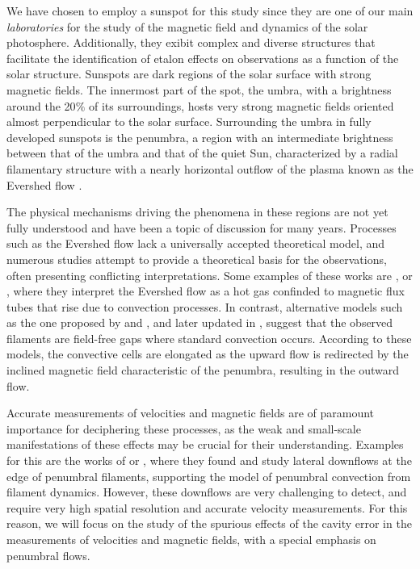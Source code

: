 We have chosen to employ a sunspot for this study since they are one of our main \textit{laboratories} for the study of the magnetic field and dynamics of the solar photosphere. Additionally, they exibit complex and diverse structures that facilitate the identification of etalon effects on observations as a function of the solar structure. Sunspots are dark regions of the solar surface with strong magnetic fields. The innermost part of the spot, the umbra, with a brightness around the 20$\%$ of its surroundings, hosts very strong magnetic fields oriented almost perpendicular to the solar surface. Surrounding the umbra in fully developed sunspots is the penumbra, a region with an intermediate brightness between that of the umbra and that of the quiet Sun, characterized by a radial filamentary structure with a nearly horizontal outflow of the plasma known as the Evershed flow \citep{evershed}. 

The physical mechanisms driving the phenomena in these regions are not yet fully understood and have been a topic of discussion for many years. Processes such as the Evershed flow lack a universally accepted theoretical model, and numerous studies attempt to provide a theoretical basis for the observations, often presenting conflicting interpretations. Some examples of these works are \cite{evershed_magnetic_flux}, or \cite{evershed_magnetic_2}, where they interpret the Evershed flow as a hot gas confinded to magnetic flux tubes that rise due to convection processes. In contrast, alternative models such as the one proposed by \cite{evershed_model_scharmer} and \cite{evershed_model_spruit}, and later updated in \cite{evershed_magnetic_scharmer}, suggest that the observed filaments are field-free gaps where standard convection occurs. According to these models, the convective cells are elongated as the upward flow is redirected by the inclined magnetic field characteristic of the penumbra, resulting in the outward flow.  

Accurate measurements of velocities and magnetic fields are of paramount importance for deciphering these processes, as the weak and small-scale manifestations of these effects may be crucial for their understanding. Examples for this are the works of \cite{lateral_downflows_2} or \cite{lateral_downflows}, where they found and study lateral downflows at the edge of penumbral filaments, supporting the model of penumbral convection from filament dynamics. However, these downflows are very challenging to detect, and require very high spatial resolution and accurate velocity measurements. For this reason, we will focus on the study of the spurious effects of the cavity error in the measurements of velocities and magnetic fields, with a special emphasis on penumbral flows. 

